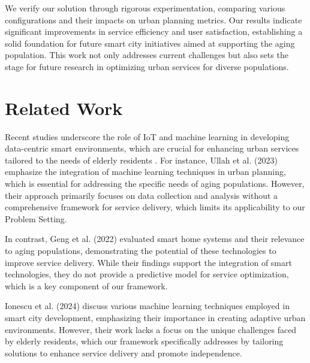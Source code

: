 \documentclass{article} %
\begin{document}
We verify our solution through rigorous experimentation, comparing various configurations and their impacts on urban planning metrics. Our results indicate significant improvements in service efficiency and user satisfaction, establishing a solid foundation for future smart city initiatives aimed at supporting the aging population. This work not only addresses current challenges but also sets the stage for future research in optimizing urban services for diverse populations.

\section{Related Work}
\label{sec:related}
Recent studies underscore the role of IoT and machine learning in developing data-centric smart environments, which are crucial for enhancing urban services tailored to the needs of elderly residents \citep{Ullah2023SmartCT}. For instance, Ullah et al. (2023) emphasize the integration of machine learning techniques in urban planning, which is essential for addressing the specific needs of aging populations. However, their approach primarily focuses on data collection and analysis without a comprehensive framework for service delivery, which limits its applicability to our Problem Setting.

In contrast, Geng et al. (2022) evaluated smart home systems and their relevance to aging populations, demonstrating the potential of these technologies to improve service delivery. While their findings support the integration of smart technologies, they do not provide a predictive model for service optimization, which is a key component of our framework.

Ionescu et al. (2024) discuss various machine learning techniques employed in smart city development, emphasizing their importance in creating adaptive urban environments. However, their work lacks a focus on the unique challenges faced by elderly residents, which our framework specifically addresses by tailoring solutions to enhance service delivery and promote independence.
\end{document}
